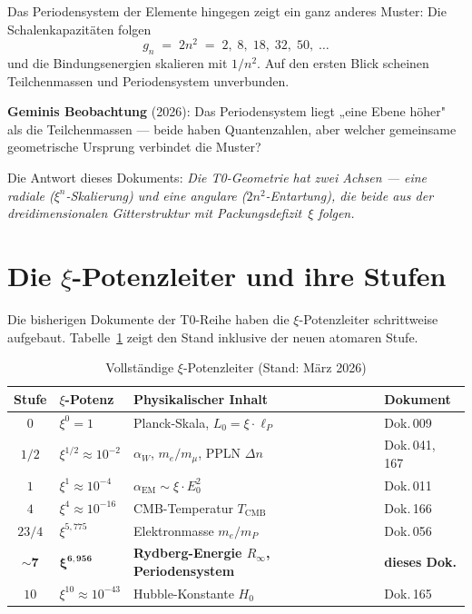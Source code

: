 Das Periodensystem der Elemente hingegen zeigt ein ganz anderes Muster:
Die Schalenkapazitäten folgen
\begin{equation}
  g_n \;=\; 2n^2 \;=\; 2,\; 8,\; 18,\; 32,\; 50,\;\ldots
  \label{eq:schalen}
\end{equation}
und die Bindungsenergien skalieren mit $1/n^2$.
Auf den ersten Blick scheinen Teilchenmassen und Periodensystem unverbunden.

\textbf{Geminis Beobachtung} (2026): Das Periodensystem liegt „eine Ebene
höher" als die Teilchenmassen — beide haben Quantenzahlen, aber welcher
gemeinsame geometrische Ursprung verbindet die Muster?

Die Antwort dieses Dokuments: \emph{Die T0-Geometrie hat zwei Achsen —
eine radiale ($\xi^n$-Skalierung) und eine angulare ($2n^2$-Entartung),
die beide aus der dreidimensionalen Gitterstruktur mit Packungsdefizit~$\xi$
folgen.}

\section{Die \texorpdfstring{$\xi$}{xi}-Potenzleiter und ihre Stufen}
\label{sec:xi-leiter}

Die bisherigen Dokumente der T0-Reihe haben die $\xi$-Potenzleiter
schrittweise aufgebaut. Tabelle~\ref{tab:xi-leiter} zeigt den Stand
inklusive der neuen atomaren Stufe.

\begin{table}[htbp]
\centering
\caption{Vollständige $\xi$-Potenzleiter (Stand: März 2026)}
\label{tab:xi-leiter}
\begin{tabular}{clll}
\hline
Stufe & $\xi$-Potenz & Physikalischer Inhalt & Dokument \\
\hline
$0$       & $\xi^0 = 1$                & Planck-Skala, $L_0 = \xi \cdot \ell_P$ & Dok.\,009 \\
$1/2$     & $\xi^{1/2} \approx 10^{-2}$ & $\alpha_W$, $m_e/m_\mu$, PPLN $\Delta n$ & Dok.\,041, 167 \\
$1$       & $\xi^1 \approx 10^{-4}$    & $\alpha_\text{EM} \sim \xi \cdot E_0^2$  & Dok.\,011 \\
$4$       & $\xi^4 \approx 10^{-16}$   & CMB-Temperatur $T_\text{CMB}$            & Dok.\,166 \\
$23/4$    & $\xi^{5{,}775}$            & Elektronmasse $m_e/m_P$                  & Dok.\,056 \\
$\mathbf{\sim 7}$ & $\boldsymbol{\xi^{6{,}956}}$ & \textbf{Rydberg-Energie $R_\infty$, Periodensystem} & \textbf{dieses Dok.} \\
$10$      & $\xi^{10} \approx 10^{-43}$& Hubble-Konstante $H_0$                   & Dok.\,165 \\
\hline
\end{tabular}
\end{table}

